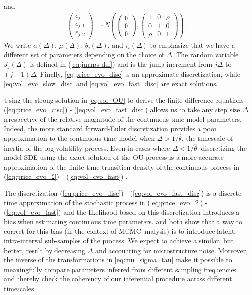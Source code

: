 and
\begin{align*}
  \left( \begin{matrix} \epsilon_{j} \\
      \epsilon_{j,1} \\ \epsilon_{j,2} \end{matrix} \right) &\sim
                                            N \left( \left(\begin{matrix} 0 \\ 0 \\
	                                          0 \end{matrix}
                                              \right) ,
  \left( \begin{matrix} 1 & 0 & \rho \\
      0 & 1 & 0 \\
    \rho & 0 & 1 \end{matrix} \right) \right) .
\end{align*}
We write $\alpha(\Delta)$, $\mu(\Delta)$, $\theta_i(\Delta)$, and
$\tau_i(\Delta)$ to emphasize that we have a different set of
parameters depending on the choice of $\Delta$. The random variable
$J_j(\Delta)$ is defined in (\ref{eq:jumps-def}) and is the jump
increment from $j\Delta$ to $(j+1)\Delta$. Finally,
\eqref{eq:price_evo_disc} is an approximate discretization, while
\eqref{eq:vol_evo_slow_disc} and \eqref{eq:vol_evo_fast_disc} are
exact solutions.

Using the strong solution in \eqref{eq:sol_OU} to derive the finite difference equations (\ref{eq:price_evo_disc}) - (\ref{eq:vol_evo_fast_disc}) allows us to take any step size $\Delta$ irrespective of the relative magnitude of the continuous-time model parameters. Indeed, the more standard forward-Euler discretization provides a poor approximation to the continuous-time model when $\Delta > 1/\hat{\theta}$, the timescale of inertia of the log-volatility process. Even in cases where $\Delta < 1/\hat{\theta}$, discretizing the model SDE  using the exact solution of the OU process is a more accurate approximation of the finite-time transition density of the continuous process in (\ref{eq:price_evo_2}) - (\ref{eq:vol_evo_fast}) \citep{elerian2001likelihood}.

The discretization (\ref{eq:price_evo_disc}) - (\ref{eq:vol_evo_fast_disc}) is a discrete-time approximation of the stochastic process in (\ref{eq:price_evo_2}) - (\ref{eq:vol_evo_fast}) and the likelihood based on this discretization introduces a bias when estimating continuous time parameters. \cite{elerian2001likelihood} and \cite{eraker2001mcmc} both show that a way to correct for this bias (in the context of MCMC analysis) is to introduce latent, intra-interval sub-samples of the process. We expect to achieve a similar, but better, result by decreasing $\Delta$ and accounting for microstructure noise. Moreover, the inverse of the transformations in \eqref{eq:mu_sigma_tau} make it possible to meaningfully compare parameters inferred from different sampling frequencies and thereby check the coherency of our inferential procedure across different timescales.

